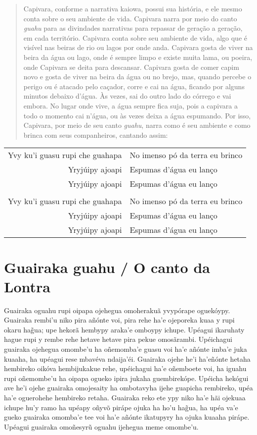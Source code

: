 \begin{quote}
Capivara, conforme a narrativa kaiowa, possui sua história, e ele mesmo
conta sobre o seu ambiente de vida. Capivara narra por meio do canto
\emph{guahu} para as divindades narrativas para repassar de geração a
geração, em cada território. Capivara conta sobre seu ambiente de vida,
algo que é visível nas beiras de rio ou lagos por onde anda. Capivara
gosta de viver na beira da água ou lago, onde é sempre limpo e existe
muita lama, ou poeira, onde Capivara se deita para descansar. Capivara
gosta de comer capim novo e gosta de viver na beira da água ou no brejo,
mas, quando percebe o perigo ou é atacado pelo caçador, corre e cai na
água, ficando por alguns minutos debaixo d'água. Às vezes, sai do outro
lado do córrego e vai embora. No lugar onde vive, a água sempre fica
suja, pois a capivara a todo o momento cai n'água, ou às vezes deixa a
água espumando. Por isso, Capivara, por meio de seu canto \emph{guahu},
narra como é seu ambiente e como brinca com seus companheiros, cantando
assim:
\end{quote}

\begin{table}[]
\begin{tabular}{rl}
Yvy ku'i guasu rupi che guahapa          & No imenso pó da terra eu brinco           \\
Yryjúipy ajoapi          & Espumas d'água eu lanço           \\
Yryjúipy ajoapi  		& Espumas d'água eu lanço \\
                  &                     \\
Yvy ku'i guasu rupi che guahapa          & No imenso pó da terra eu brinco           \\
Yryjúipy ajoapi          & Espumas d'água eu lanço           \\
Yryjúipy ajoapi  		& Espumas d'água eu lanço \\
\end{tabular}
\end{table}

\chapter{Guairaka guahu / O canto da Lontra}

Guairaka oguahu rupi oipapa ojehegua omoherakuã yvypórape oguekóypy.
Guairaka rembi'u niko pira añónte voi, pira rehe ha'e ojeporeka kuaa y
rupi okaru hag̃ua; upe hekorã hembypy araka'e omboypy ichupe. Upéagui
ikaruhaty hague rupi y rembe rehe hetave hetave pira pekue omosãrambi.
Upéichagui guairaka ojehegua omombe'u ha oñemomba'e guasu voi ha'e
añónte imba'e juka kuaaha, ha upéagui rese mbavéva ndaija'éi. Guairaka
ojehe he'i ha'eñónte hetaha hembireko oikóva hembijukakue rehe,
upéichagui ha'e oñemboete voi, ha iguahu rupi oñemombe'u ha oipapa
ogueko ipira jukaha guembirekópe. Upéicha hekógui ave he'i ojehe
guairaka omojesaity ha ombotavyha ijehe guapicha rembireko, upéa ha'e
oguerohehe hembireko retaha. Guairaka reko ete ypy niko ha'e hãi ojekuaa
ichupe hu'y ramo ha upéapy oñyvõ pirápe ojuka ha ho'u hag̃ua, ha upéa
va'e gueko guairaka omomba'e tee voi ha'e añónte ikatupyry ha ojuka
kuaaha pirápe. Upéagui guairaka omoñesyrũ oguahu ijehegua meme omombe'u.

